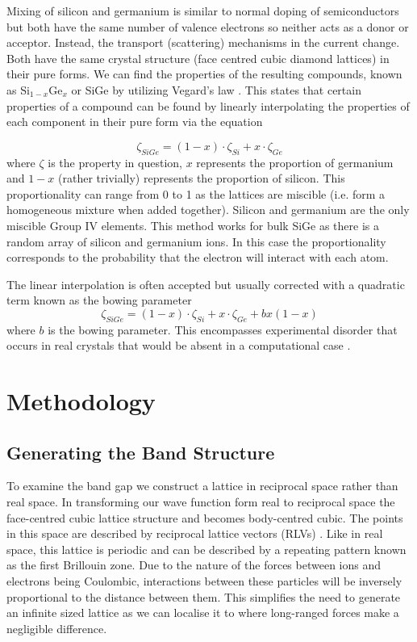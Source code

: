 \documentclass[10pt, twocolumn]{revtex4}    %
\begin{document}
Mixing of silicon and germanium is similar to normal doping of semiconductors but both have the same number of valence electrons so neither acts as a donor or acceptor. Instead, the transport (scattering) mechanisms in the current change. Both have the same crystal structure (face centred cubic diamond lattices)\cite{ref04} in their pure forms. We can find the properties of the resulting compounds, known as Si$_{1-x}$Ge$_x$ or SiGe by utilizing Vegard's law \cite{ref05}. This states that certain properties of a compound can be found by linearly interpolating the properties of each component in their pure form via the equation \cite{ref06}

\begin{equation}
    \zeta_{SiGe} = (1-x)\cdot\zeta_{Si}  +  x\cdot\zeta_{Ge}
\end{equation}
where $\zeta$ is the property in question, $x$ represents the proportion of germanium and $1-x$ (rather trivially) represents the proportion of silicon. This proportionality can range from 0 to 1 as the lattices are miscible (i.e. form a homogeneous mixture when added together). Silicon and germanium are the only miscible Group IV elements. This method works for bulk SiGe as there is a random array of silicon and germanium ions. In this case the proportionality corresponds to the probability that the electron will interact with each atom.

The linear interpolation is often accepted but usually corrected with a quadratic term known as the bowing parameter
\begin{equation}
    \zeta_{SiGe} = (1-x)\cdot\zeta_{Si}  +  x\cdot\zeta_{Ge} + bx(1-x)
\end{equation}
where $b$ is the bowing parameter. This encompasses experimental disorder that occurs in real crystals that would be absent in a computational case \cite{ref07}.


\section{Methodology}

\subsection{Generating the Band Structure}

To examine the band gap we construct a lattice in reciprocal space rather than real space. In transforming our wave function form real to reciprocal space the face-centred cubic lattice structure and becomes body-centred cubic. The points in this space are described by reciprocal lattice vectors (RLVs) \cite{ref08}. Like in real space, this lattice is periodic and can be described by a repeating pattern known as the first Brillouin zone. Due to the nature of the forces between ions and electrons being Coulombic, interactions between these particles will be inversely proportional to the distance between them. This simplifies the need to generate an infinite sized lattice as we can localise it to where long-ranged forces make a negligible difference.\\
\end{document}
